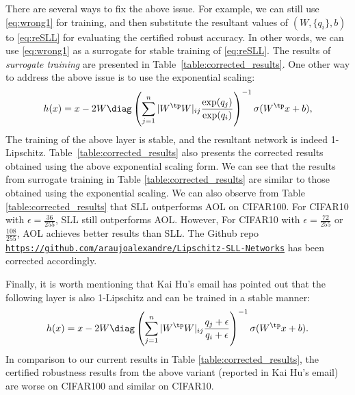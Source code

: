 \documentclass{article} \usepackage{iclr2023_conference,times}
\newcommand{\0}{\mathbf{0} }
\begin{document}
There are several ways to fix the above issue.
For example, we can still use \eqref{eq:wrong1} for training, and then substitute the resultant values of  $(W, \{q_i\}, b)$ to \eqref{eq:reSLL} for evaluating the certified robust accuracy. In other words, we can use \eqref{eq:wrong1} as a surrogate for stable training of \eqref{eq:reSLL}.  The results of \emph{surrogate training} are presented in Table~\ref{table:corrected_results}.
One other way to address the above issue is to use the exponential scaling:
\begin{equation} \label{eq:exp}
  h(x) = x - 2W\diag\left(\sum_{j=1}^n |W^\tp W|_{ij} \frac{\exp(q_j)}{\exp(q_i)} \right)
  ^{-1}\sigma(W^\tp x+b),
\end{equation}
The training of the above layer is stable, and the resultant network is indeed 1-Lipschitz. Table~\ref{table:corrected_results} also presents the corrected results obtained using the above exponential scaling form.
We can see that the results from surrogate training in Table \ref{table:corrected_results} are similar to those obtained using the exponential scaling. 
We can also observe from Table \ref{table:corrected_results} that SLL outperforms AOL on CIFAR100. For CIFAR10 with $\epsilon=\frac{36}{255}$, SLL still outperforms AOL. However, For CIFAR10 with $\epsilon=\frac{72}{255}$ or $\frac{108}{255}$, AOL achieves better results than SLL.
The Github repo \href{https://github.com/araujoalexandre/Lipschitz-SLL-Networks}{\texttt{https://github.com/araujoalexandre/Lipschitz-SLL-Networks}} has been corrected accordingly.




Finally, it is worth mentioning that Kai Hu's email has pointed out that the following layer is also 1-Lipschitz and can be trained in a stable manner:
\begin{equation*}
  h(x) = x - 2W\diag\left(\sum_{j=1}^n |W^\tp W|_{ij} \frac{q_j + \epsilon}{q_i + \epsilon} \right)
  ^{-1}\sigma(W^\tp x+b).
\end{equation*}
In comparison to our current results in Table \ref{table:corrected_results}, the certified robustness results from the above variant (reported in Kai Hu's email) are worse on CIFAR100 and similar on CIFAR10.
\end{document}
